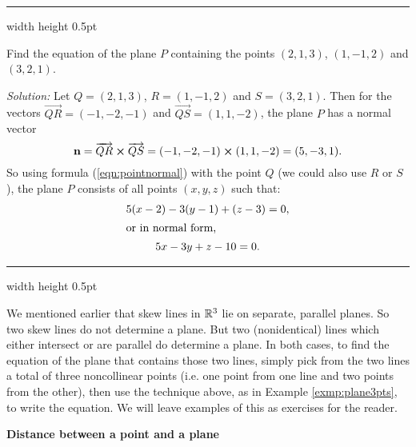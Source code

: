 \hrule width \textwidth height 0.5pt
\begin{exmp}\label{exmp:plane3pts}
 Find the equation of the plane $P$ containing the points $(2,1,3)$, $(1,-1,2)$ and $(3,2,1)$.\vspace{1mm}
 \par\noindent\emph{Solution:} Let $Q = (2,1,3)$, $R = (1,-1,2)$ and $S = (3,2,1)$. Then for the vectors
 $\overrightarrow{QR} = (-1,-2,-1)$ and $\overrightarrow{QS} = (1,1,-2)$, the plane $P$ has a normal vector
 \begin{displaymath}
  \textbf{n} = \overrightarrow{QR} \bm{\times} \overrightarrow{QS} = (-1,-2,-1) \bm{\times} (1,1,-2) = (5,-3,1).
 \end{displaymath}
 So using formula (\ref{eqn:pointnormal}) with the point $Q$ (we could also use $R$ or $S$), the plane $P$ consists of
 all points $(x,y,z)$ such that:
 \begin{gather*}
  5(x - 2) - 3(y - 1) + (z - 3) = 0,\\
  \intertext{or in normal form,}
  5x - 3y + z - 10 = 0.
 \end{gather*}
\end{exmp}
\hrule width \textwidth height 0.5pt
\vspace{2mm}

We mentioned earlier that skew lines in $\mathbb{R}^{3}$ lie on separate, parallel planes. 
So two skew lines do not determine
a plane. 
But two (nonidentical) lines which either intersect or are parallel do determine a plane. 
In both cases, to
find the equation of the plane that contains those two lines, simply pick from the two lines a total of three
noncollinear points (i.e. one point from one line and two points from the other), then use the technique above, as in
Example \ref{exmp:plane3pts}, to write the equation. We will leave examples of this as exercises for the reader.
\pagebreak[3]
\par\noindent\textbf{\large{Distance between a point and a plane}}\normalsize\vspace{1.5mm}

